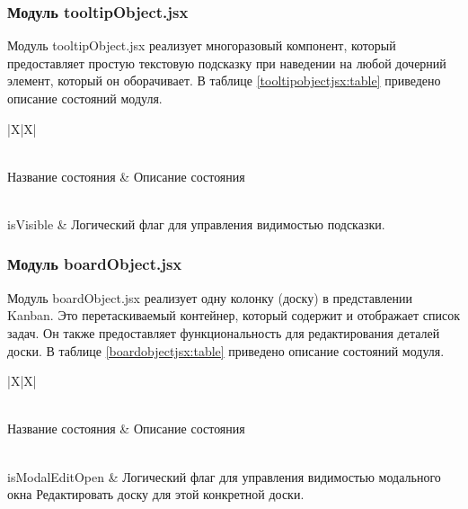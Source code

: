 \subsubsection{Модуль tooltipObject.jsx}
Модуль tooltipObject.jsx реализует многоразовый компонент, который предоставляет простую текстовую подсказку при наведении на любой дочерний элемент, который он оборачивает. В таблице \ref{tooltipobjectjsx:table} приведено описание состояний модуля.

\renewcommand{\arraystretch}{0.8}
\begin{xltabular}{\textwidth}{|X|X|}
	\caption{Описание состояний, используемых в tooltipObject.jsx\label{tooltipobjectjsx:table}}\\
	\hline \centrow \setlength{\baselineskip}{0.7\baselineskip} Название состояния & \centrow \setlength{\baselineskip}{0.7\baselineskip} Описание состояния \\\hline
	\endfirsthead
	\caption*{Продолжение таблицы \ref{tooltipobjectjsx:table}}\\ \hline
	\finishhead
	isVisible & Логический флаг для управления видимостью подсказки. \\ \hline
\end{xltabular}

\subsubsection{Модуль boardObject.jsx}
Модуль boardObject.jsx реализует одну колонку (доску) в представлении Kanban. Это перетаскиваемый контейнер, который содержит и отображает список задач. Он также предоставляет функциональность для редактирования деталей доски. В таблице \ref{boardobjectjsx:table} приведено описание состояний модуля.

\renewcommand{\arraystretch}{0.8}
\begin{xltabular}{\textwidth}{|X|X|}
	\caption{Описание состояний, используемых в boardObject.jsx\label{boardobjectjsx:table}}\\
	\hline \centrow \setlength{\baselineskip}{0.7\baselineskip} Название состояния & \centrow \setlength{\baselineskip}{0.7\baselineskip} Описание состояния \\\hline
	\endfirsthead
	\caption*{Продолжение таблицы \ref{boardobjectjsx:table}}\\ \hline
	\finishhead
	isModalEditOpen & Логический флаг для управления видимостью модального окна Редактировать доску для этой конкретной доски. \\ \hline
\end{xltabular}

